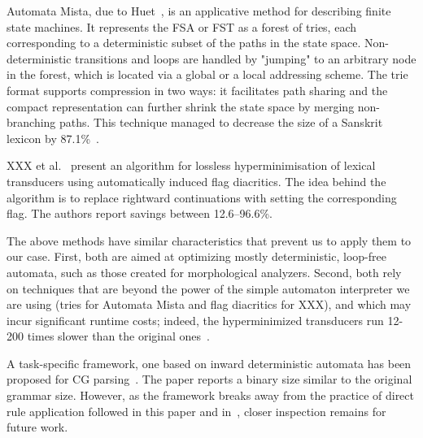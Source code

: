\documentclass{article}
\begin{document}
Automata Mista, due to Huet~, is an applicative
method for describing finite state machines. It represents the FSA or FST as
a forest of tries, each corresponding to a deterministic subset of the paths in
the state space. Non-deterministic transitions and loops are handled by
"jumping" to an arbitrary node in the forest, which is located via a global or a
local addressing scheme. The trie format supports compression in two ways: it
facilitates path sharing and the compact representation can further shrink the
state space by merging non-branching paths. This technique managed to decrease
the size of a Sanskrit lexicon by 87.1\%~\cite{Huet:2005}.

XXX et al.~ present an algorithm for lossless
hyperminimisation of lexical transducers using automatically induced flag
diacritics. The idea behind the algorithm is to replace rightward continuations
with setting the corresponding flag. The authors report savings between
12.6--96.6\%.

The above methods have similar characteristics that prevent us to apply them to
our case. First, both are aimed at optimizing mostly deterministic, loop-free
automata, such as those created for morphological analyzers. Second, both rely
on techniques that are beyond the power of the simple automaton interpreter
we are using (tries for Automata Mista and flag diacritics for XXX), and which
may incur significant runtime costs; indeed, the hyperminimized transducers run
12-200 times slower than the original ones~\cite{XXX:2014}. 

A task-specific framework, one based on inward deterministic automata has
been proposed for CG parsing~\cite{Yli-Jyra:2011}. The paper reports a binary
size similar to the original grammar size. However, as the framework breaks away
from the practice of direct rule application followed in this paper and
in~\cite{Hulden:2011,Peltonen:2011}, closer inspection remains for future work. 

\end{document}
